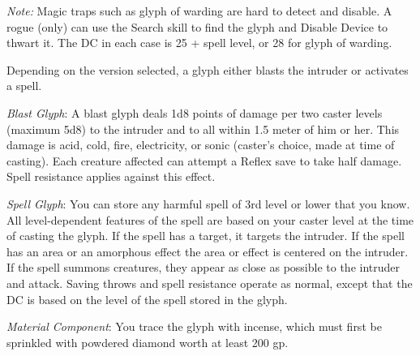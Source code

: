 {	\textit{Note:} Magic traps such as glyph of warding are hard to detect and disable. A rogue (only) can use the Search skill to find the glyph and Disable Device to thwart it. The DC in each case is 25 + spell level, or 28 for glyph of warding.

	Depending on the version selected, a glyph either blasts the intruder or activates a spell.

	\textit{Blast Glyph}:
	A blast glyph deals 1d8 points of damage per two caster levels (maximum 5d8) to the intruder and to all within 1.5 meter of him or her. This damage is acid, cold, fire, electricity, or sonic (caster's choice, made at time of casting). Each creature affected can attempt a Reflex save to take half damage. Spell resistance applies against this effect.

	\textit{Spell Glyph}:
	You can store any harmful spell of 3rd level or lower that you know. All level-dependent features of the spell are based on your caster level at the time of casting the glyph. If the spell has a target, it targets the intruder. If the spell has an area or an amorphous effect the area or effect is centered on the intruder. If the spell summons creatures, they appear as close as possible to the intruder and attack. Saving throws and spell resistance operate as normal, except that the DC is based on the level of the spell stored in the glyph.

	\textit{Material Component}:
	You trace the glyph with incense, which must first be sprinkled with powdered diamond worth at least 200 gp.

}
